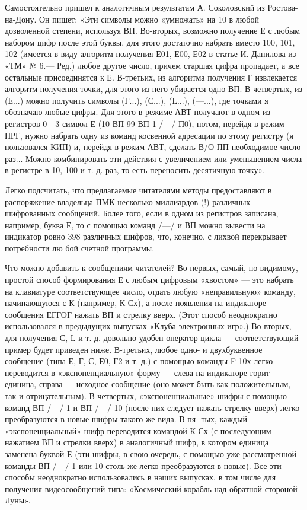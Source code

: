 \documentclass[11pt,a4paper,oneside]{article}
\begin{document}
Самостоятельно пришел к аналогичным результатам А. Соколовский из Ростова-на-Дону. Он пишет: «Эти символы можно «умножать» на 10 в любой дозволенной степени, используя ВП. Во-вторых, возможно получение Е с любым набором цифр после этой буквы, для этого достаточно набрать вместо 100, 101, 102 (имеется в виду алгоритм получения Е01, Е00, Е02 в статье И. Данилова из «ТМ» № 6.— Ред.) любое другое число, причем старшая цифра пропадает, а все остальные присоединятся к Е. В-третьих, из алгоритма получения Г извлекается алгоритм получения точки, для этого из него убирается одно ВП. В-четвертых, из (Е...) можно получить символы (Г...), (С...), (L...), (—...), где точками я обозначаю любые цифры. Для этого в режиме АВТ получают в одном из регистров 0—3 символ Е (10 ВП 99 ВП 1 /—/ П0), потом, перейдя в режим ПРГ, нужно набрать одну из команд косвенной адресации по этому регистру (я пользовался КИП) и, перейдя в режим АВТ, сделать В/О ПП необходимое число раз... Можно комбинировать эти действия с увеличением или уменьшением числа в регистре в 10, 100 и т. д. раз, то есть переносить десятичную точку».

Легко подсчитать, что предлагаемые читателями методы предоставляют в распоряжение владельца ПМК несколько миллиардов (!) различных шифрованных сообщений. Более того, если в одном из регистров записана, например, буква Е, то с помощью команд /—/ и ВП можно вывести на индикатор ровно 398 различных шифров, что, конечно, с лихвой перекрывает потребности лю
бой счетной программы.

Что можно добавить к сообщениям читателей? Во-первых, самый, по-видимому, простой способ формирования Е с любым цифровым «хвостом» — это набрать на клавиатуре соответствующее число, отдать любую «неправильную» команду, начинающуюся с К (например, К Сх), а после появления на индикаторе сообщения ЕГГОГ нажать ВП и стрелку вверх. (Этот способ неоднократно использовался в предыдущих выпусках «Клуба электронных игр».) Во-вторых, для получения С, L и т. д. довольно удобен оператор цикла — соответствующий пример будет приведен ниже. В-третьих, любое одно- и двухбуквенное сообщение (типа Е, Г, С, Е0, Г2 и т. д.) с помощью команды F 10х легко переводится в «экспоненциальную» форму — слева на индикаторе горит единица, справа — исходное сообщение (оно может быть как положительным, так и отрицательным). В-четвертых, «экспоненциальные» шифры с помощью команд ВП /—/ 1 и ВП /—/ 10 (после них следует нажать стрелку вверх) легко преобразуются в новые шифры такого же вида. В-пя- тых, каждый «экспоненциальный» шифр переводится командой К Сх (с последующим нажатием ВП и стрелки вверх) в аналогичный шифр, в котором единица заменена буквой Е (эти шифры, в свою очередь, с помощью уже рассмотренной команды ВП /—/ 1 или 10 столь же легко преобразуются в новые). Все эти способы неоднократно использовались в наших выпусках, в том числе для получения видеосообщений типа: «Космический корабль над обратной стороной Луны».
\end{document}
